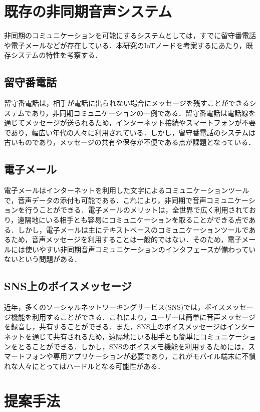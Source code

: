 \documentclass[submit,techrep,noauthor]{ipsj}
\begin{document}
\section{既存の非同期音声システム}
非同期のコミュニケーションを可能にするシステムとしては，すでに留守番電話や電子メールなどが存在している．本研究のIoTノードを考案するにあたり，既存システムの特性を考察する．

\subsection{留守番電話}
留守番電話は，相手が電話に出られない場合にメッセージを残すことができるシステムであり，非同期コミュニケーションの一例である．留守番電話は電話線を通じてメッセージが送られるため，インターネット接続やスマートフォンが不要であり，幅広い年代の人々に利用されている．しかし，留守番電話のシステムは古いものであり，メッセージの共有や保存が不便である点が課題となっている．

\subsection{電子メール}
電子メールはインターネットを利用した文字によるコミュニケーションツールで，音声データの添付も可能である．これにより，非同期で音声コミュニケーションを行うことができる．電子メールのメリットは，全世界で広く利用されており，遠隔地にいる相手とも容易にコミュニケーションを取ることができる点である．しかし，電子メールは主にテキストベースのコミュニケーションツールであるため，音声メッセージを利用することは一般的ではない．そのため，電子メールには使いやすい非同期音声コミュニケーションのインタフェースが備わっていないという問題がある．

\subsection{SNS上のボイスメッセージ}
近年，多くのソーシャルネットワーキングサービス(SNS)では，ボイスメッセージ機能を利用することができる．これにより，ユーザーは簡単に音声メッセージを録音し，共有することができる．また，SNS上のボイスメッセージはインターネットを通じて共有されるため，遠隔地にいる相手とも簡単にコミュニケーションをとることができる．しかし，SNSのボイスメモ機能を利用するためには，スマートフォンや専用アプリケーションが必要であり，これがモバイル端末に不慣れな人々にとってはハードルとなる可能性がある．

\section{提案手法}
\label{system}
\end{document}
